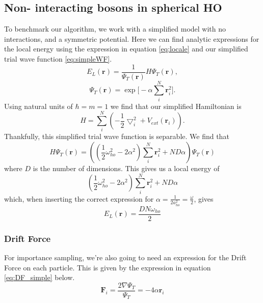 \documentclass[11pt,a4paper,titlepage]{article}
\begin{document}
\subsection{Non- interacting bosons in spherical HO}
To benchmark our algorithm, we work with a simplified model with no interactions, and a symmetric potential. Here we can find analytic expressions for the local energy using the expression in equation \eqref{eq:locale} and our simplified trial wave function \eqref{eq:simpleWF}.
\begin{equation}
    E_L(\mathbf{r})=\frac{1}{\Psi_T(\mathbf{r})}H\Psi_T(\mathbf{r}),
    \label{eq:locale}
 \end{equation}
\begin{equation}
 \Psi_T(\mathbf{r}) = \exp{\Bigg[-\alpha\sum\limits_i^N\textbf{r}_i^2\Bigg]}.
 \label{eq:simpleWF}
\end{equation}
Using natural units of $\hbar = m = 1$ we find that our simplified Hamiltonian is
\begin{equation}
     H = \sum_i^N \left(-\frac{1}{2}{\bigtriangledown }_{i}^2 +V_{ext}({\mathbf{r}}_i)\right).
 \end{equation}
Thankfully, this simplified trial wave function is separable. We find that
\begin{equation}
H\Psi_T(\mathbf{r}) = \left( \left( \frac{1}{2}\omega_{ho}^2 - 2\alpha^2 \right)\sum\limits_i^N \textbf{r}_i^2 + ND\alpha \right)\Psi_T(\mathbf{r})
\end{equation}
where $D$ is the number of dimensions. This gives us a local energy of 
\begin{equation}
\left( \frac{1}{2}\omega_{ho}^2 - 2\alpha^2 \right)\sum\limits_i^N \textbf{r}_i^2 + ND\alpha
\end{equation}
which, when inserting the correct expression for $\alpha = \frac{1}{2a_{ho}^2} =\frac{\omega}{2}$, gives
\begin{equation}
E_L(\mathbf{r}) = \frac{DN\omega_{ho}}{2}\label{eq:localEnergyAnalytical}
\end{equation}
 
\subsubsection{Drift Force}
For importance sampling, we're also going to need an expression for the Drift Force on each particle. This is given by the expression in equation \eqref{eq:DF_simple} below.
\begin{equation}
   \textbf{F}_i = \frac{2\nabla \Psi_T}{\Psi_T} = -4\alpha\textbf{r}_i
   \label{eq:DF_simple}
 \end{equation}
\end{document}
